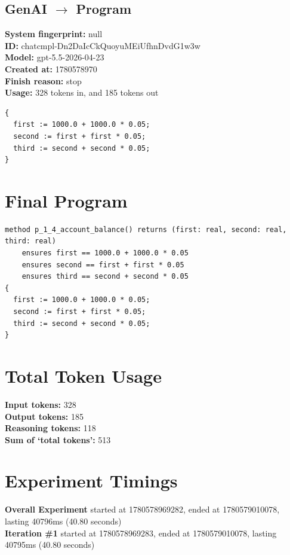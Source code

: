 \documentclass{article}
\begin{document}
\subsection*{GenAI $\rightarrow$ Program}
\textbf{System fingerprint: }null
\\\textbf{ID: }chatcmpl-Dn2DaIcCkQuoyuMEiUfhnDvdG1w3w
\\\textbf{Model: }gpt-5.5-2026-04-23
\\\textbf{Created at: }1780578970
\\\textbf{Finish reason: }stop
\\\textbf{Usage: }328 tokens in, and 185 tokens out
\begin{lstlisting}
{
  first := 1000.0 + 1000.0 * 0.05;
  second := first + first * 0.05;
  third := second + second * 0.05;
}
\end{lstlisting}
\section*{Final Program}
\begin{lstlisting}
method p_1_4_account_balance() returns (first: real, second: real, third: real)
	ensures first == 1000.0 + 1000.0 * 0.05
	ensures second == first + first * 0.05
	ensures third == second + second * 0.05
{
  first := 1000.0 + 1000.0 * 0.05;
  second := first + first * 0.05;
  third := second + second * 0.05;
}
\end{lstlisting}
\section*{Total Token Usage}
\textbf{Input tokens: }328
\\\textbf{Output tokens: }185
\\\textbf{Reasoning tokens: }118
\\\textbf{Sum of `total tokens': }513
\section*{Experiment Timings}
\textbf{Overall Experiment} started at 1780578969282, ended at 1780579010078, lasting 40796ms (40.80 seconds)
\\\textbf{Iteration \#1} started at 1780578969283, ended at 1780579010078, lasting 40795ms (40.80 seconds)
\end{document}
